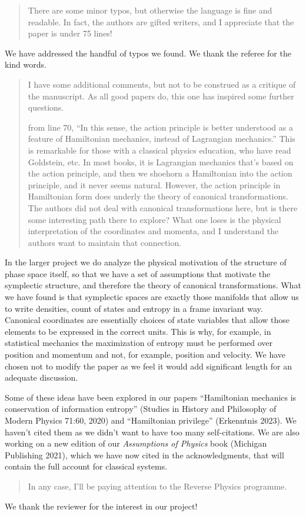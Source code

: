 \documentclass[11pt, executivepaper]{article}
\begin{document}
\begin{quote}
There are some minor typos, but otherwise the language is fine and readable. In fact, the authors are gifted writers, and I appreciate that the paper is under 75 lines!
\end{quote}
We have addressed the handful of typos we found. We thank the referee for the kind words.

\begin{quote}
I have some additional comments, but not to be construed as a critique of the manuscript. As all good papers do, this one has inspired some further questions. 

from line 70, “In this sense, the action principle is better understood as a feature of Hamiltonian mechanics, instead of Lagrangian mechanics.” This is remarkable for those with a classical physics education, who have read Goldstein, etc. In most books, it is Lagrangian mechanics that’s based on the action principle, and then we shoehorn a Hamiltonian into the action principle, and it never seems natural. However, the action principle in Hamiltonian form does underly the theory of canonical transformations. The authors did not deal with canonical transformations here, but is there some interesting path there to explore? What one loses is the physical interpretation of the coordinates and momenta, and I understand the authors want to maintain that connection.
\end{quote}
In the larger project we do analyze the physical motivation of the structure of phase space itself, so that we have a set of assumptions that motivate the symplectic structure, and therefore the theory of canonical transformations. What we have found is that symplectic spaces are exactly those manifolds that allow us to write densities, count of states and entropy in a frame invariant way. Canonical coordinates are essentially choices of state variables that allow those elements to be expressed in the correct units. This is why, for example, in statistical mechanics the maximization of entropy must be performed over position and momentum and not, for example, position and velocity. We have chosen not to modify the paper as we feel it would add significant length for an adequate discussion.

Some of these ideas have been explored in our papers ``Hamiltonian mechanics is conservation of information entropy'' (Studies in History and Philosophy of Modern Physics 71:60, 2020) and ``Hamiltonian privilege'' (Erkenntnis 2023). We haven't cited them as we didn't want to have too many self-citations. We are also working on a new edition of our \emph{Assumptions of Physics} book (Michigan Publishing 2021), which we have now cited in the acknowledgments, that will contain the full account for classical systems.

\begin{quote}
In any case, I'll be paying attention to the Reverse Physics programme.
\end{quote}
We thank the reviewer for the interest in our project!

 
%
%
\end{document}
